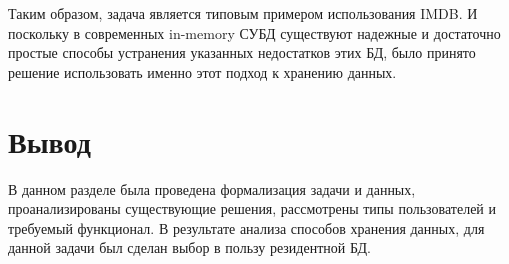 Таким образом, задача является типовым примером использования IMDB. И поскольку в современных in-memory СУБД существуют надежные и достаточно простые способы устранения указанных недостатков этих БД, было принято решение использовать именно этот подход к хранению данных.





\section*{Вывод}
В данном разделе была проведена формализация задачи и данных, проанализированы существующие решения, рассмотрены типы пользователей и требуемый функционал. В результате анализа способов хранения данных, для данной задачи был сделан выбор в пользу резидентной БД.


